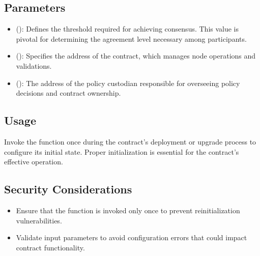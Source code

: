 \documentclass[a4paper,10pt,english]{sphinxmanual}
\begin{document}
\subsection{Parameters}
\label{\detokenize{docs_consensus_mechanism_contract:parameters}}\begin{itemize}
\item {} 
\sphinxAtStartPar
{} ():
Defines the threshold required for achieving consensus. This value is pivotal for determining the agreement level necessary among participants.

\item {} 
\sphinxAtStartPar
{} ():
Specifies the address of the  contract, which manages node operations and validations.

\item {} 
\sphinxAtStartPar
{} ():
The address of the policy custodian responsible for overseeing policy decisions and contract ownership.

\end{itemize}


\subsection{Usage}
\label{\detokenize{docs_consensus_mechanism_contract:usage}}
\sphinxAtStartPar
Invoke the  function once during the contract’s deployment or upgrade process to configure its initial state. Proper initialization is essential for the contract’s effective operation.


\subsection{Security Considerations}
\label{\detokenize{docs_consensus_mechanism_contract:security-considerations}}\begin{itemize}
\item {} 
\sphinxAtStartPar
{} Ensure that the  function is invoked only once to prevent re\sphinxhyphen{}initialization vulnerabilities.

\item {} 
\sphinxAtStartPar
{} Validate input parameters to avoid configuration errors that could impact contract functionality.

\end{itemize}
\end{document}
